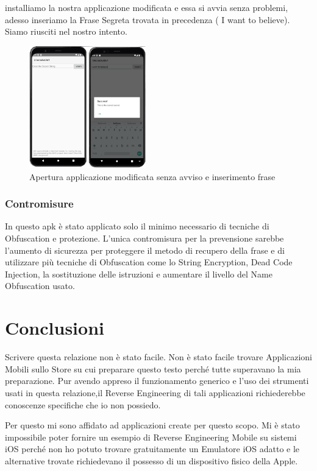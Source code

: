 \documentclass{article}
\begin{document}
installiamo la nostra applicazione modificata e essa si avvia senza problemi, adesso inseriamo la Frase Segreta trovata in precedenza ( I want to believe).
Siamo riusciti nel nostro intento. 

\begin{figure}[h]
    \centering
    \includegraphics[width=0.45\textwidth]{./uncrackable1/modded.png}
    \captionsetup{labelformat=empty}
    \caption{Apertura applicazione modificata senza avviso e inserimento frase}
    \label{fig:modded}
\end{figure}


\subsubsection*{Contromisure}
In questo apk è stato applicato solo il minimo necessario di tecniche di Obfuscation e protezione. L'unica contromisura per la prevensione sarebbe l'aumento di sicurezza per proteggere il metodo 
di recupero della frase e di utilizzare 
più tecniche di Obfuscation come lo String Encryption, Dead Code Injection, la sostituzione delle istruzioni e aumentare il livello del Name Obfuscation 
usato.






\newpage
\section{Conclusioni}
Scrivere questa relazione non è stato facile. Non è stato facile trovare Applicazioni Mobili sullo Store su cui preparare questo testo perché tutte superavano 
la mia preparazione. Pur avendo appreso 
il funzionamento generico e l'uso dei strumenti usati in questa relazione,il Reverse Engineering di tali applicazioni richiederebbe conoscenze specifiche che io non possiedo. 

Per questo mi sono affidato ad 
applicazioni create per questo scopo. Mi è stato impossibile poter fornire un esempio di Reverse Engineering Mobile su sistemi iOS perché 
non ho potuto trovare gratuitamente un Emulatore iOS adatto e le alternative trovate richiedevano il possesso di un dispositivo fisico della Apple.
\end{document}
